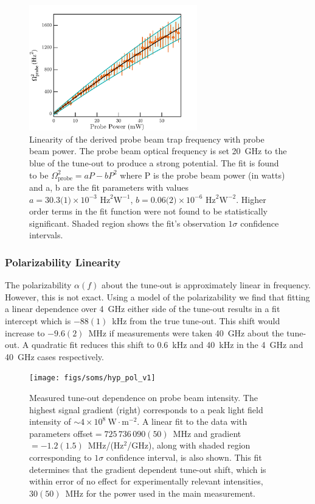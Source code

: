 \documentclass[%
 amsmath,amssymb,
aps,
]{revtex4-2}
\begin{document}
\begin{figure}
    \centering
    \includegraphics[width=0.65\textwidth]{figs/soms/probe_beam_linearity}
    \caption{Linearity of the derived probe beam trap frequency with probe beam power. The probe beam optical frequency is set 20~GHz to the blue of the tune-out to produce a strong potential. The fit is found to be \( \Omega_{\mathrm{probe}}^2 = a  P - b P^2 \) where P is the probe beam power (in watts) and a, b are the fit parameters with values \(a=\text{30.3(1)}\times 10^{-3}\text{~Hz}^2\text{W}^{-1}\), \(b= \text{0.06(2)} \times 10^{-6}\text{~Hz}^2\text{W}^{-2}\). Higher order terms in the fit function were not found to be statistically significant. Shaded region shows the fit's observation \(1\sigma\) confidence intervals.
    }
    \label{fig:probe_beam_linearity}
\end{figure}

\subsubsection{Polarizability Linearity}
The polarizability $\alpha(f)$ about the tune-out is approximately linear in frequency. However, this is not exact. Using a model of the polarizability we find that fitting a linear dependence over 4~GHz either side of the tune-out results in a fit intercept which is $-88(1)$~kHz from the true tune-out. This shift would increase to $-9.6(2)$~MHz if measurements were taken 40~GHz about the tune-out. A quadratic fit reduces this shift to 0.6~kHz and 40~kHz in the 4~GHz and 40~GHz cases respectively.

\begin{figure}[t]
    \centering
    \texttt{[image: figs/soms/hyp\_pol\_v1]}
    \caption{Measured tune-out dependence on probe beam intensity. The highest signal gradient (right) corresponds to a peak light field intensity of \(\sim4\times10^{8}\: \mathrm{W}\cdot \mathrm{m}^{-2}\). A linear fit to the data with parameters offset\(=725\,736\,090(50)\)~MHz and gradient\(=-1.2(1.5)\)~MHz/(Hz\(^2\)/GHz), along with shaded region corresponding to \(1\sigma\) confidence interval, is also shown. This fit determines that the gradient dependent tune-out shift, which is within error of no effect for experimentally relevant intensities, $30(50)$~MHz for the power used in the main measurement.
    }
    \label{fig:hyperpolarizability}
\end{figure}
\end{document}
